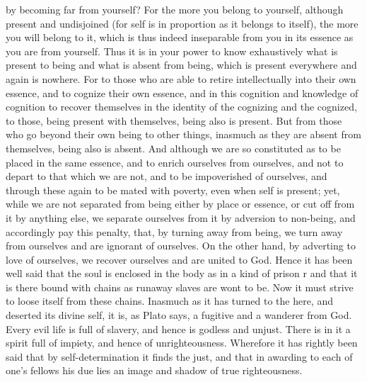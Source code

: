 \documentclass{article}
\begin{document}
by becoming far from yourself? For the more you belong to yourself, although present and undisjoined (for self is in proportion as it belongs to itself), the more you will belong to it, which is thus indeed inseparable from you in its essence as you are from yourself. Thus it is in your power to know exhaustively what is present to being and what is absent from being, which is present everywhere and again is nowhere. For to those who are able to retire intellectually into their own essence, and to cognize their own essence, and in this cognition and knowledge of cognition to recover themselves in the identity of the cognizing and the cognized, to those, being present with themselves, being also is present. But from those who go beyond their own being to other things, inasmuch as they are absent from themselves, being also is absent. And although we are so constituted as to be placed in the same essence, and to enrich ourselves from ourselves, and not to depart to that which we are not, and to be impoverished of ourselves, and through these again to be mated with poverty, even when self is present; yet, while we are not separated from being either by place or essence, or cut off from it by anything else, we separate ourselves from it by adversion to non-being, and accordingly pay this penalty, that, by turning away from being, we turn away from ourselves and are ignorant of ourselves. On the other hand, by adverting to love of ourselves, we recover ourselves and are united to God. Hence it has been well said that the soul is enclosed in the body as in a kind of prison r and that it is there bound with chains as runaway slaves are wont to be. Now it must strive to loose itself from these chains. Inasmuch as it has turned to the here, and deserted its divine self, it is, as Plato says, a fugitive and a wanderer from God. Every evil life is full of slavery, and hence is godless and unjust. There is in it a spirit full of impiety, and hence of unrighteousness. Wherefore it has rightly been said that by self-determination it finds the just, and that in awarding to each of one’s fellows his due lies an image and shadow of true righteousness.
\end{document}
